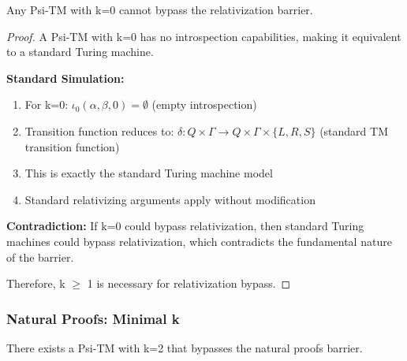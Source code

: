 \documentclass[11pt]{article}
\begin{document}
\begin{theorem}
\label{thm:relativization-k0}
Any Psi-TM with k=0 cannot bypass the relativization barrier.
\end{theorem}

\begin{proof}
A Psi-TM with k=0 has no introspection capabilities, making it equivalent to a standard Turing machine.

\textbf{Standard Simulation:}
\begin{enumerate}
\item For k=0: $\iota_0(\alpha, \beta, 0) = \emptyset$ (empty introspection)
\item Transition function reduces to: $\delta: Q \times \Gamma \to Q \times \Gamma \times \{L, R, S\}$ (standard TM transition function)
\item This is exactly the standard Turing machine model
\item Standard relativizing arguments apply without modification
\end{enumerate}

\textbf{Contradiction:} If k=0 could bypass relativization, then standard Turing machines could bypass relativization, which contradicts the fundamental nature of the barrier.

Therefore, k $\geq$ 1 is necessary for relativization bypass.
\end{proof}

\subsubsection{Natural Proofs: Minimal k}

\begin{theorem}[Natural Proofs Bypass with k=2]
\label{thm:natural-proofs-k2}
There exists a Psi-TM with k=2 that bypasses the natural proofs barrier.
\end{theorem}
\end{document}
